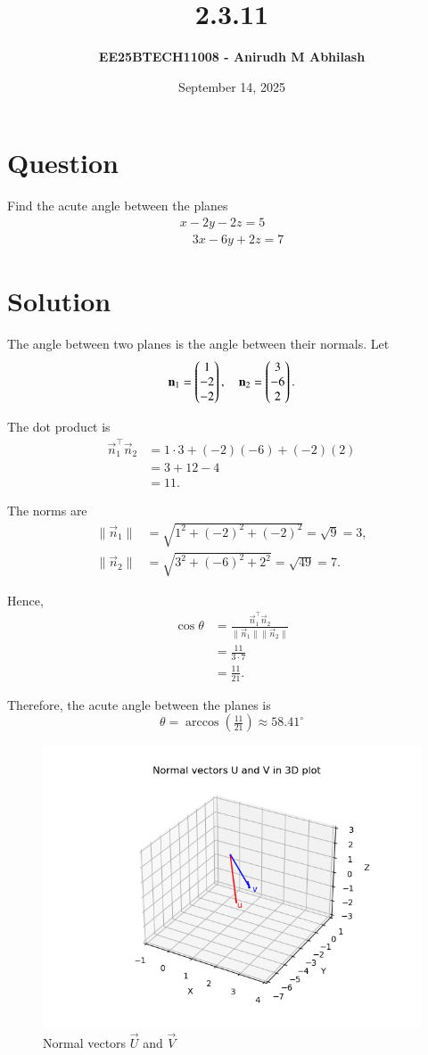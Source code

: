 \documentclass[12pt]{article}
\title{\textbf{2.3.11}}
\author{\textbf{EE25BTECH11008 - Anirudh M Abhilash}}
\date{September 14, 2025}
\begin{document}
\maketitle
\section*{Question}

Find the acute angle between the planes 
\begin{align*}
x - 2y - 2z = 5 \\
\quad 3x - 6y + 2z = 7
\end{align*}

\section*{Solution}

The angle between two planes is the angle between their normals.
Let
\[
\mathbf{n}_1 = \begin{pmatrix}1 \\ -2 \\ -2\end{pmatrix}, 
\quad \mathbf{n}_2 = \begin{pmatrix}3 \\ -6 \\ 2\end{pmatrix}.
\]

The dot product is
\begin{align}
\vec{n}_1^\top \vec{n}_2 &= 1\cdot 3 + (-2)(-6) + (-2)(2) \\
&= 3 + 12 - 4 \\
&= 11.
\end{align}

The norms are
\begin{align}
\|\vec{n}_1\| &= \sqrt{1^2 + (-2)^2 + (-2)^2} = \sqrt{9} = 3, \\
\|\vec{n}_2\| &= \sqrt{3^2 + (-6)^2 + 2^2} = \sqrt{49} = 7.
\end{align}

Hence,
\begin{align}
\cos\theta &= \frac{\vec{n}_1^\top \vec{n}_2}{\|\vec{n}_1\|\|\vec{n}_2\|} \\
&= \frac{11}{3\cdot 7} \\
&= \frac{11}{21}.
\end{align}

Therefore, the acute angle between the planes is
\[
\boxed{\theta = \arccos\!\left(\tfrac{11}{21}\right) \approx 58.41^\circ}
\]

\begin{figure}[H]\centering
\includegraphics[width=1\columnwidth]{figs/plt.png}
\caption{Normal vectors $\vec{U}$ and $\vec{V}$}
\label{fig:plt}
\end{figure}
\end{document}
